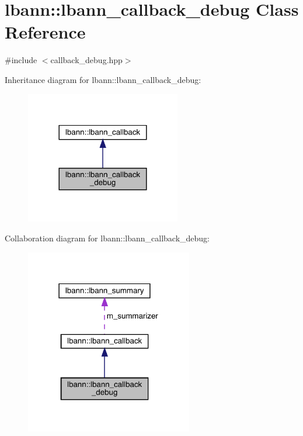 \hypertarget{classlbann_1_1lbann__callback__debug}{}\section{lbann\+:\+:lbann\+\_\+callback\+\_\+debug Class Reference}
\label{classlbann_1_1lbann__callback__debug}


{\ttfamily \#include $<$callback\+\_\+debug.\+hpp$>$}



Inheritance diagram for lbann\+:\+:lbann\+\_\+callback\+\_\+debug\+:\nopagebreak
\begin{figure}[H]
\begin{center}
\leavevmode
\includegraphics[width=192pt]{classlbann_1_1lbann__callback__debug__inherit__graph}
\end{center}
\end{figure}


Collaboration diagram for lbann\+:\+:lbann\+\_\+callback\+\_\+debug\+:\nopagebreak
\begin{figure}[H]
\begin{center}
\leavevmode
\includegraphics[width=207pt]{classlbann_1_1lbann__callback__debug__coll__graph}
\end{center}
\end{figure}
